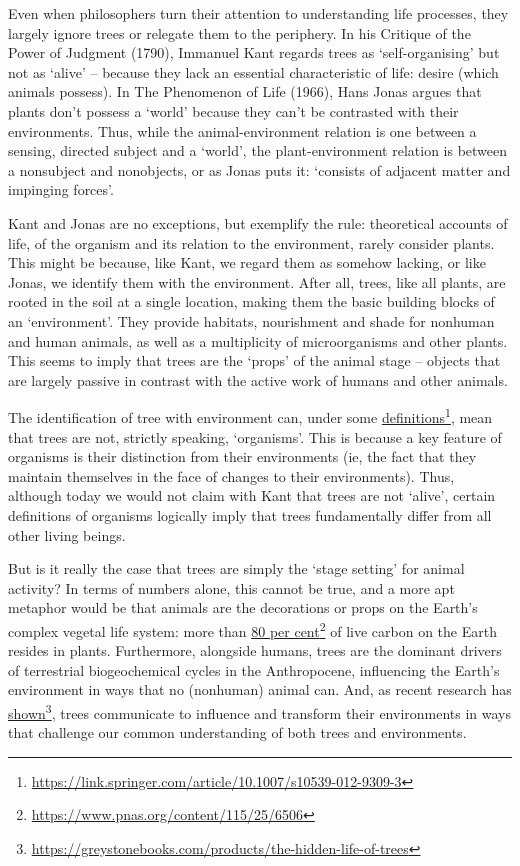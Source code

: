 \documentclass[../main.tex]{subfiles}
\begin{document}
\begin{multicols}{2}
{Even when philosophers turn their attention to understanding life processes, they largely ignore trees or relegate them to the periphery. In his Critique of the Power of Judgment (1790), Immanuel Kant regards trees as ‘self-organising’ but not as ‘alive’ – because they lack an essential characteristic of life: desire (which animals possess). In The Phenomenon of Life (1966), Hans Jonas argues that plants don’t possess a ‘world’ because they can’t be contrasted with their environments. Thus, while the animal-environment relation is one between a sensing, directed subject and a ‘world’, the plant-environment relation is between a nonsubject and nonobjects, or as Jonas puts it: ‘consists of adjacent matter and impinging forces’. 

Kant and Jonas are no exceptions, but exemplify the rule: theoretical accounts of life, of the organism and its relation to the environment, rarely consider plants. This might be because, like Kant, we regard them as somehow lacking, or like Jonas, we identify them with the environment. After all, trees, like all plants, are rooted in the soil at a single location, making them the basic building blocks of an ‘environment’. They provide habitats, nourishment and shade for nonhuman and human animals, as well as a multiplicity of microorganisms and other plants. This seems to imply that trees are the ‘props’ of the animal stage – objects that are largely passive in contrast with the active work of humans and other animals. 

The identification of tree with environment can, under some \href{https://link.springer.com/article/10.1007/s10539-012-9309-3}{definitions}\footnote{\url{https://link.springer.com/article/10.1007/s10539-012-9309-3}}, mean that trees are not, strictly speaking, ‘organisms’. This is because a key feature of organisms is their distinction from their environments (ie, the fact that they maintain themselves in the face of changes to their environments). Thus, although today we would not claim with Kant that trees are not ‘alive’, certain definitions of organisms logically imply that trees fundamentally differ from all other living beings. 

But is it really the case that trees are simply the ‘stage setting’ for animal activity? In terms of numbers alone, this cannot be true, and a more apt metaphor would be that animals are the decorations or props on the Earth’s complex vegetal life system: more than \href{https://www.pnas.org/content/115/25/6506}{80 per cent}\footnote{\url{https://www.pnas.org/content/115/25/6506}} of live carbon on the Earth resides in plants. Furthermore, alongside humans, trees are the dominant drivers of terrestrial biogeochemical cycles in the Anthropocene, influencing the Earth’s environment in ways that no (nonhuman) animal can. And, as recent research has \href{https://greystonebooks.com/products/the-hidden-life-of-trees}{shown}\footnote{\url{https://greystonebooks.com/products/the-hidden-life-of-trees}}, trees communicate to influence and transform their environments in ways that challenge our common understanding of both trees and environments. 

}
\end{multicols}
\end{document}
